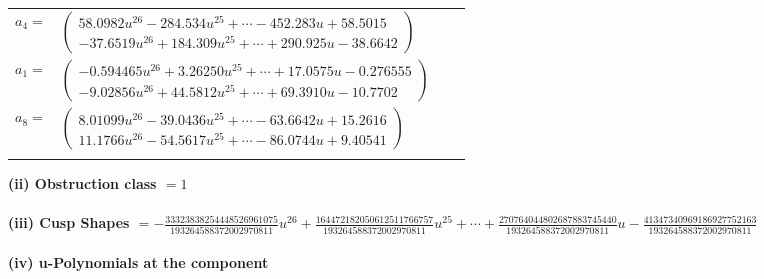 \documentclass[1p]{elsarticle_modified}
\theoremstyle{definition}
\begin{document}
\begin{tabular}{m{7pt} m{180pt} m{7pt} m{180pt} }
\flushright $a_{4}=$&$\begin{pmatrix}58.0982 u^{26}-284.534 u^{25}+\cdots-452.283 u+58.5015\\-37.6519 u^{26}+184.309 u^{25}+\cdots+290.925 u-38.6642\end{pmatrix}$ \\
\flushright $a_{1}=$&$\begin{pmatrix}-0.594465 u^{26}+3.26250 u^{25}+\cdots+17.0575 u-0.276555\\-9.02856 u^{26}+44.5812 u^{25}+\cdots+69.3910 u-10.7702\end{pmatrix}$ \\
\flushright $a_{8}=$&$\begin{pmatrix}8.01099 u^{26}-39.0436 u^{25}+\cdots-63.6642 u+15.2616\\11.1766 u^{26}-54.5617 u^{25}+\cdots-86.0744 u+9.40541\end{pmatrix}$\\&\end{tabular}
\flushleft \textbf{(ii) Obstruction class $= 1$}\\~\\
\flushleft \textbf{(iii) Cusp Shapes $= -\frac{33323838254448526961075}{193264588372002970811} u^{26}+\frac{164472182050612511766757}{193264588372002970811} u^{25}+\cdots+\frac{270764044802687883745440}{193264588372002970811} u-\frac{41347340969186927752163}{193264588372002970811}$}\\~\\
\newpage\renewcommand{\arraystretch}{1}
\flushleft \textbf{(iv) u-Polynomials at the component}\newline \\
\end{document}
